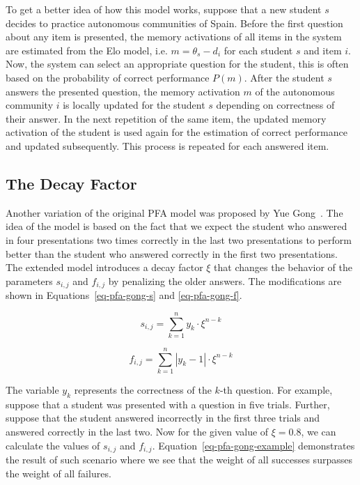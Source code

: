 To get a better idea of how this model works, suppose that a new student $s$ decides to practice autonomous communities of Spain. Before the first question about any item is presented, the memory activations of all items in the system are estimated from the Elo model, i.e. $m = \theta_s - d_i$ for each student $s$ and item $i$. Now, the system can select an appropriate question for the student, this is often based on the probability of correct performance $P(m)$. After the student $s$ answers the presented question, the memory activation $m$ of the autonomous community $i$ is locally updated for the student $s$ depending on correctness of their answer. In the next repetition of the same item, the updated memory activation of the student is used again for the estimation of correct performance and updated subsequently. This process is repeated for each answered item.

\subsection*{The Decay Factor}
\label{pfag}

Another variation of the original PFA model was proposed by Yue Gong~\cite{Gong2011}. The idea of the model is based on the fact that we expect the student who answered in four presentations two times correctly in the last two presentations to perform better than the student who answered correctly in the first two presentations. The extended model introduces a decay factor $\xi$ that changes the behavior of the parameters $s_{i,j}$ and $f_{i,j}$ by penalizing the older answers. The modifications are shown in Equations~\ref{eq-pfa-gong-s} and \ref{eq-pfa-gong-f}.

\begin{equation} \label{eq-pfa-gong-s}
  s_{i,j} = \sum_{k=1}^{n} y_k \cdot \xi^{n-k}
\end{equation}

\begin{equation} \label{eq-pfa-gong-f}
  f_{i,j} = \sum_{k=1}^{n} |y_k - 1| \cdot \xi^{n-k}
\end{equation}

The variable $y_k$ represents the correctness of the $k$-th question. For example, suppose that a student was presented with a question in five trials. Further, suppose that the student answered incorrectly in the first three trials and answered correctly in the last two. Now for the given value of $\xi = 0.8$, we can calculate the values of $s_{i,j}$ and $f_{i,j}$. Equation~\ref{eq-pfa-gong-example} demonstrates the result of such scenario where we see that the weight of all successes surpasses the weight of all failures.

